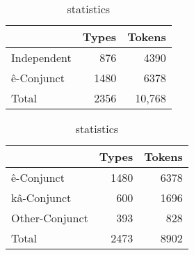 \begin{table}
\centering
\begin{tabular}{lrr} \\
\toprule
               & Types & Tokens \\
\midrule
Independent    &  876  & 4390   \\
ê-Conjunct     & 1480  & 6378   \\
\midrule
Total &  2356  & 10,768   \\
\bottomrule
\end{tabular}
\caption{ statistics \label{tab:corpstats2}
}
\end{table}


\begin{table}
\centering
\begin{tabular}{lrr} \\
\toprule
               & Types & Tokens \\
\midrule
ê-Conjunct    &  1480  & 6378   \\
kâ-Conjunct     & 600  & 1696   \\
Other-Conjunct     & 393  & 828   \\
\midrule
Total &  2473  & 8902   \\
\bottomrule
\end{tabular}
\caption{ statistics \label{tab:corpstats3}
}
\end{table}


